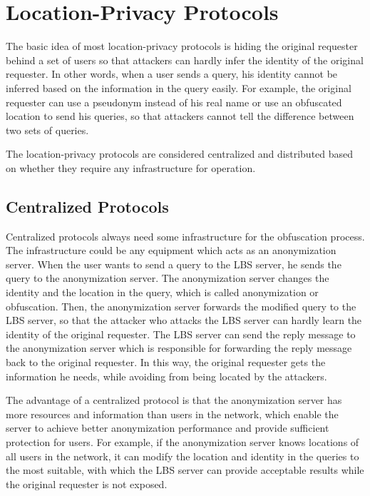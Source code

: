 \section{Location-Privacy Protocols}

\noindent The basic idea of most location-privacy protocols is hiding the original requester behind a set of users so that attackers can hardly infer the identity of the original requester. In other words, when a user sends a query, his identity cannot be inferred based on the information in the query easily. For example, the original requester can use a pseudonym instead of his real name or use an obfuscated location to send his queries, so that attackers cannot tell the difference between two sets of queries. 

The location-privacy protocols are considered centralized and distributed based on whether they require any infrastructure for operation. 


\subsection{ Centralized Protocols}

\noindent Centralized protocols always need some infrastructure for the obfuscation process. The infrastructure could be any equipment which acts as an anonymization server. When the user wants to send a query to the LBS server, he sends the query to the anonymization server. The anonymization server changes the identity and the location in the query, which is called anonymization or obfuscation. Then, the anonymization server forwards the modified query to the LBS server, so that the attacker who attacks the LBS server can hardly learn the identity of the original requester. The LBS server can send the reply message to the anonymization server which is responsible for forwarding the reply message back to the original requester. In this way, the original requester gets the information he needs, while avoiding from being located by the attackers.

The advantage of a centralized protocol is that the anonymization server has more resources and information than users in the network, which enable the server to achieve better anonymization performance and provide sufficient protection for users. For example, if the anonymization server knows locations of all users in the network, it can modify the location and identity in the queries to the most suitable, with which the LBS server can provide acceptable results while the original requester is not exposed.

